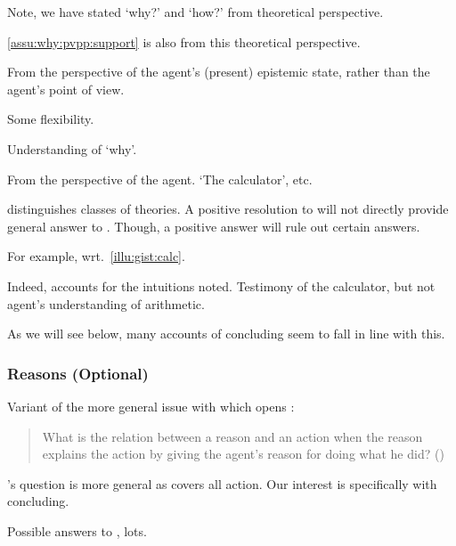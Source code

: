 \begin{note}
  Note, we have stated `why?' and `how?' from theoretical perspective.

  \autoref{assu:why:pvpp:support} is also from this theoretical perspective.
\end{note}

\begin{note}
  From the perspective of the agent's (present) epistemic state, rather than the agent's point of view.

  Some flexibility.
\end{note}

\begin{note}
  Understanding of `why'.

  From the perspective of the agent.
  `The calculator', etc.
\end{note}

\begin{note}
  \issueInclusion{} distinguishes classes of theories.
  A positive resolution to \issueInclusion{} will not directly provide general answer to \qWhy{}.
  Though, a positive answer will rule out certain answers.

  For example, wrt.~\autoref{illu:gist:calc}.

  Indeed, accounts for the intuitions noted.
  Testimony of the calculator, but not agent's understanding of arithmetic.

  As we will see below, many accounts of concluding seem to fall in line with this.
\end{note}

\subsubsection{Reasons (Optional)}

\begin{note}

\end{note}

\begin{note}
  Variant of the more general issue with which \citeauthor{Davidson:1963aa} opens :

  \begin{quote}
    What is the relation between a reason and an action when the reason explains the action by giving the agent’s reason for doing what he did?%
    \mbox{}\hfill\mbox{(\citeyear[685]{Davidson:1963aa})}
  \end{quote}

  \citeauthor{Davidson:1963aa}'s question is more general as covers all action.
  Our interest is specifically with concluding.

  Possible answers to \qWhy{}, lots.
\end{note}

